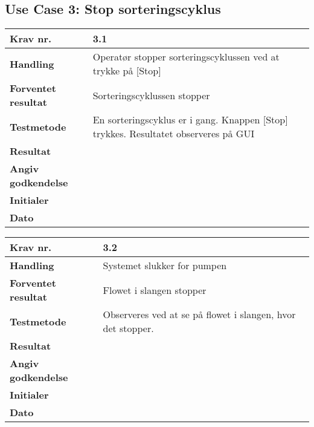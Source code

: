   \subsection{Use Case 3: Stop sorteringscyklus}

	\begin{center}
		\begin{longtable}{ | m{4cm}| m{8.5cm}|} 
			\hline
			\textbf{Krav nr.} & 3.1  \\ 
			\hline
			\textbf{Handling} & Operatør stopper sorteringscyklussen ved at trykke på [Stop] \\
			\hline
			\textbf{Forventet resultat} & Sorteringscyklussen stopper \\
			\hline
			\textbf{Testmetode}  &En sorteringscyklus er i gang. Knappen [Stop] trykkes. Resultatet observeres på GUI  \\
			\hline
			\textbf{Resultat}  &    \\
			\hline
			\textbf{Angiv godkendelse} &     \\
			\hline
			\textbf{Initialer} &     \\
			\hline
			\textbf{Dato} &    \\
			\hline
		\end{longtable}
	\end{center}
			
	\begin{center}
		\begin{longtable}{ | m{4cm}| m{8.5cm}|} 
			\hline
			\textbf{Krav nr.} & 3.2  \\ 
			\hline
			\textbf{Handling} & Systemet slukker for pumpen \\
			\hline
			\textbf{Forventet resultat} & Flowet i slangen stopper \\
			\hline
			\textbf{Testmetode}  & Observeres ved at se på flowet i slangen, hvor det stopper.  \\
			\hline
			\textbf{Resultat}  &    \\
			\hline
			\textbf{Angiv godkendelse} &     \\
			\hline
			\textbf{Initialer} &     \\
			\hline
			\textbf{Dato} &    \\
			\hline
		\end{longtable}
	\end{center}
			
